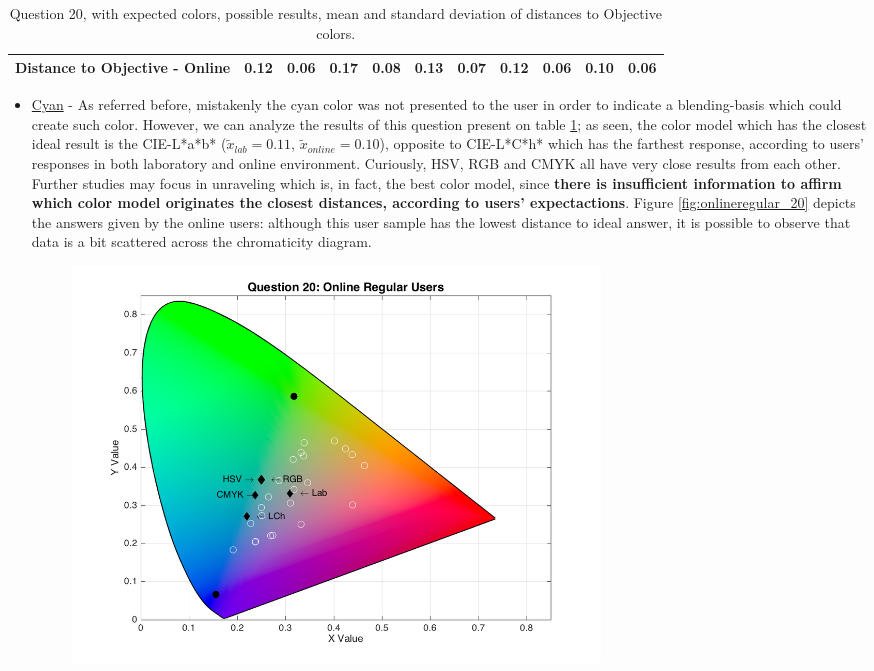 \begin{table}[!htbp]
{\begin{tabular}{lccccccccccccc}
    \multicolumn{4}{l|}{Distance to Objective - Online}                                                                                                                & 0.12                  & \multicolumn{1}{c|}{0.06}          & 0.17                  & \multicolumn{1}{c|}{0.08}          & 0.13                 & \multicolumn{1}{c|}{0.07}          & 0.12                 & \multicolumn{1}{c|}{0.06}          & \textbf{0.10}         & \multicolumn{1}{c|}{0.06}         \\ \hline
  \end{tabular}}
  \caption[Question 20, with expected Results.]{Question 20, with expected colors, possible results, mean and standard deviation of distances to Objective colors.}
  \label{table:lab_q20_expected}
\end{table}
%
\begin{itemize}
  \item \ul{Cyan} - As referred before, mistakenly the cyan color was not presented to the user in order to indicate a blending-basis which could create such color. However, we can analyze the results of
  this question present on table \ref{table:lab_q20_expected}; as seen, the color model which has the closest ideal result is the CIE-L*a*b* ($\tilde{x}_{lab} = 0.11$, $\tilde{x}_{online} = 0.10$), opposite
  to CIE-L*C*h* which has the farthest response, according to users' responses in both laboratory and online environment. Curiously, HSV, RGB and CMYK all have very close results from each other. Further
  studies may focus in unraveling which is, in fact, the best color model, since \textbf{there is insufficient information to affirm which color model originates the closest distances, according to users'
  expectactions}. Figure \ref{fig:onlineregular_20} depicts the answers given by the online users: although this user sample has the lowest distance to ideal answer, it is possible to observe that data is
  a bit scattered across the chromaticity diagram.
  \begin{figure}[!htbp]
    \centering
    \includegraphics[width=0.7\textwidth]{images/results/20_online_regularUsers.png}

\end{figure}
\end{itemize}
